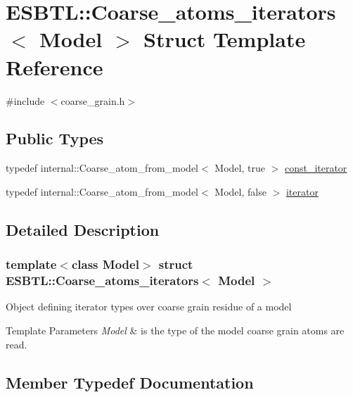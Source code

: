 \hypertarget{structESBTL_1_1Coarse__atoms__iterators}{}\section{E\+S\+B\+TL\+:\+:Coarse\+\_\+atoms\+\_\+iterators$<$ Model $>$ Struct Template Reference}
\label{structESBTL_1_1Coarse__atoms__iterators}


{\ttfamily \#include $<$coarse\+\_\+grain.\+h$>$}

\subsection*{Public Types}
\begin{DoxyCompactItemize}
\item 
typedef internal\+::\+Coarse\+\_\+atom\+\_\+from\+\_\+model$<$ Model, true $>$ \hyperlink{structESBTL_1_1Coarse__atoms__iterators_acff1d0d843ccc6f72f18fa24b1b016db}{const\+\_\+iterator}
\item 
typedef internal\+::\+Coarse\+\_\+atom\+\_\+from\+\_\+model$<$ Model, false $>$ \hyperlink{structESBTL_1_1Coarse__atoms__iterators_adfb6d7bbe918849df2d701becde2c8d5}{iterator}
\end{DoxyCompactItemize}


\subsection{Detailed Description}
\subsubsection*{template$<$class Model$>$\newline
struct E\+S\+B\+T\+L\+::\+Coarse\+\_\+atoms\+\_\+iterators$<$ Model $>$}

Object defining iterator types over coarse grain residue of a model 
\begin{DoxyTemplParams}{Template Parameters}
{\em Model} & is the type of the model coarse grain atoms are read. \\
\hline
\end{DoxyTemplParams}


\subsection{Member Typedef Documentation}
\mbox{\label{structESBTL_1_1Coarse__atoms__iterators_acff1d0d843ccc6f72f18fa24b1b016db}} 
